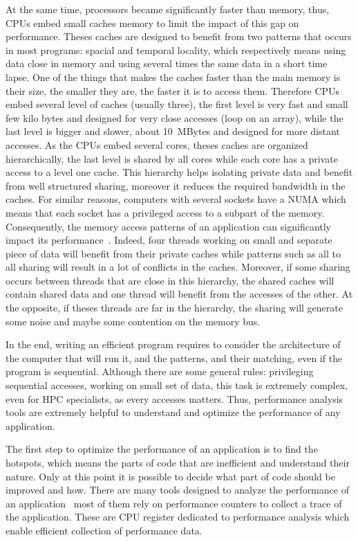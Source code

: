 At the same time, processors became significantly faster than memory, thus, \glspl{CPU} embed small caches memory to limit the impact of this gap on performance.
Theses caches are designed to benefit from two patterns that occurs in most programs: spacial and temporal locality, which respectively means using data close in memory and using several times the same data in a short time lapse.
One of the things that makes the caches faster than the main memory is their size, the smaller they are, the faster it is to access them.
Therefore \glspl{CPU} embed several level of caches (usually three), the first level is very fast and small few kilo bytes and designed for very close accesses (loop on an array), while the  last level is bigger and slower, about \SI{10}{MBytes} and designed for more distant accesses.
As the \glspl{CPU} embed several cores, theses caches are organized hierarchically, the last level is shared by all cores while each core has a private access to a level one cache.
This hierarchy helps isolating private data and benefit from well structured sharing, moreover it reduces the required bandwidth in the caches.
For similar reasons, computers with several sockets have a \gls{NUMA} which means that each socket has a privileged access to a subpart of the memory.
Consequently, the memory access patterns of an application can significantly impact its performance~\cite{Drepper07What}.
Indeed, four threads working on small and separate piece of data will benefit from their private caches while patterns such as all to all sharing will result in a lot of conflicts in the caches.
Moreover, if some sharing occurs between threads that are close in this hierarchy, the shared caches will contain shared data and one thread will benefit from the accesses of the other.
At the opposite, if theses threads are far in the hierarchy, the sharing will generate some noise and maybe some contention on the memory bus.

In the end, writing an efficient program requires to consider the architecture of the computer that will run it, and the patterns, and their matching, even if the program is sequential.
Although there are some general rules: privileging sequential accesses, working on small set of data, this task is extremely complex, even for \gls{HPC} specialists, as every accesses matters.
Thus, performance analysis tools are extremely helpful to understand and optimize the performance of any application.

The first step to optimize the performance of an application is to find the hotspots, which means the parts of code that are inefficient and understand their nature.
Only at this point it is possible to decide what part of code should be improved and how.
There are many tools designed to analyze the performance of an application~\cite{Pillet95PARAVER,Browne00Portable,Shende06Tau,Treibig10LIKWID,Adhianto10HPCTOOLKIT} most of them rely on performance counters to collect a trace of the application.
These are \gls{CPU} register dedicated to performance analysis which enable efficient collection of performance data.

